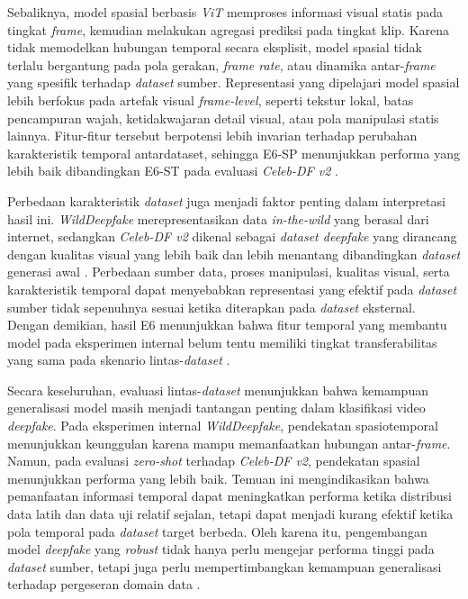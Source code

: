 Sebaliknya, model spasial berbasis \textit{ViT} memproses informasi visual statis pada tingkat \textit{frame}, kemudian melakukan agregasi prediksi pada tingkat klip. Karena tidak memodelkan hubungan temporal secara eksplisit, model spasial tidak terlalu bergantung pada pola gerakan, \textit{frame rate}, atau dinamika antar-\textit{frame} yang spesifik terhadap \textit{dataset} sumber. Representasi yang dipelajari model spasial lebih berfokus pada artefak visual \textit{frame-level}, seperti tekstur lokal, batas pencampuran wajah, ketidakwajaran detail visual, atau pola manipulasi statis lainnya. Fitur-fitur tersebut berpotensi lebih invarian terhadap perubahan karakteristik temporal antardataset, sehingga E6-SP menunjukkan performa yang lebih baik dibandingkan E6-ST pada evaluasi \textit{Celeb-DF v2} \cite{app12062953}.

Perbedaan karakteristik \textit{dataset} juga menjadi faktor penting dalam interpretasi hasil ini. \textit{WildDeepfake} merepresentasikan data \textit{in-the-wild} yang berasal dari internet, sedangkan \textit{Celeb-DF v2} dikenal sebagai \textit{dataset deepfake} yang dirancang dengan kualitas visual yang lebih baik dan lebih menantang dibandingkan \textit{dataset} generasi awal \cite{li2020celebdflargescalechallengingdataset}. Perbedaan sumber data, proses manipulasi, kualitas visual, serta karakteristik temporal dapat menyebabkan representasi yang efektif pada \textit{dataset} sumber tidak sepenuhnya sesuai ketika diterapkan pada \textit{dataset} eksternal. Dengan demikian, hasil E6 menunjukkan bahwa fitur temporal yang membantu model pada eksperimen internal belum tentu memiliki tingkat transferabilitas yang sama pada skenario lintas-\textit{dataset} \cite{nadimpalli2022improvingcrossdatasetgeneralizationdeepfake}.

Secara keseluruhan, evaluasi lintas-\textit{dataset} menunjukkan bahwa kemampuan generalisasi model masih menjadi tantangan penting dalam klasifikasi video \textit{deepfake}. Pada eksperimen internal \textit{WildDeepfake}, pendekatan spasiotemporal menunjukkan keunggulan karena mampu memanfaatkan hubungan antar-\textit{frame}. Namun, pada evaluasi \textit{zero-shot} terhadap \textit{Celeb-DF v2}, pendekatan spasial menunjukkan performa yang lebih baik. Temuan ini mengindikasikan bahwa pemanfaatan informasi temporal dapat meningkatkan performa ketika distribusi data latih dan data uji relatif sejalan, tetapi dapat menjadi kurang efektif ketika pola temporal pada \textit{dataset} target berbeda. Oleh karena itu, pengembangan model \textit{deepfake} yang \textit{robust} tidak hanya perlu mengejar performa tinggi pada \textit{dataset} sumber, tetapi juga perlu mempertimbangkan kemampuan generalisasi terhadap pergeseran domain data \cite{nadimpalli2022improvingcrossdatasetgeneralizationdeepfake}.

